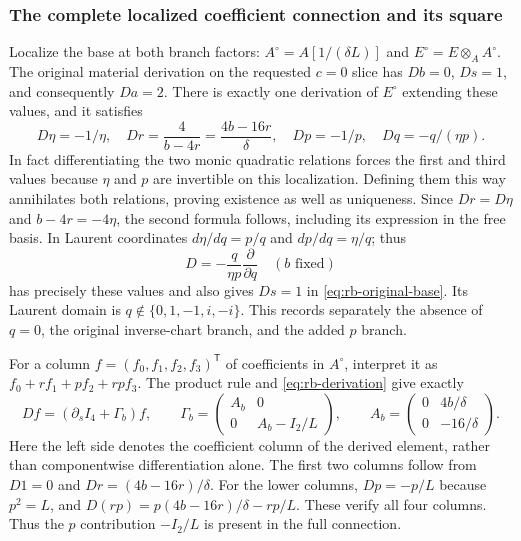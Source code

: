 \subsubsection{The complete localized coefficient connection and its square}
Localize the base at both branch factors: $A^\circ=A[1/(\delta L)]$
and $E^\circ=E\otimes_AA^\circ$. The original material derivation on
the requested $c=0$ slice has $Db=0$, $Ds=1$, and consequently
$Da=2$. There is exactly one derivation of $E^\circ$ extending
these values, and it satisfies
\begin{equation}\label{eq:rb-derivation}
 D\eta=-1/\eta,\quad
 Dr=\frac4{b-4r}=\frac{4b-16r}{\delta},\quad
 Dp=-1/p,\quad
 Dq=-q/(\eta p).
\end{equation}
In fact differentiating the two monic quadratic relations forces
the first and third values because $\eta$ and $p$ are invertible
on this localization. Defining them this way annihilates both
relations, proving existence as well as uniqueness. Since
$Dr=D\eta$ and $b-4r=-4\eta$, the second formula follows, including
its expression in the free basis. In Laurent coordinates
$d\eta/dq=p/q$ and $dp/dq=\eta/q$; thus
\[
 D=-\frac{q}{\eta p}\frac{\partial}{\partial q}\quad(b\text{ fixed})
\]
has precisely these values and also gives $Ds=1$ in
\eqref{eq:rb-original-base}. Its Laurent domain is
$q\notin\{0,1,-1,i,-i\}$. This records separately the absence of
$q=0$, the original inverse-chart branch, and the added $p$ branch.

For a column $f=(f_0,f_1,f_2,f_3)^{\mathsf T}$ of coefficients in
$A^\circ$, interpret it as $f_0+rf_1+pf_2+rpf_3$.
The product rule and \eqref{eq:rb-derivation} give exactly
\begin{equation}\label{eq:rb-full-connection}
 Df=(\partial_sI_4+\Gamma_b)f,\qquad
 \Gamma_b=\begin{pmatrix}A_b&0\\0&A_b-I_2/L\end{pmatrix},\qquad
 A_b=\begin{pmatrix}0&4b/\delta\\0&-16/\delta\end{pmatrix}.
\end{equation}
Here the left side denotes the coefficient column of the derived
element, rather than componentwise differentiation alone.
The first two columns follow from $D1=0$ and
$Dr=(4b-16r)/\delta$. For the lower columns, $Dp=-p/L$ because
$p^2=L$, and
$D(rp)=p(4b-16r)/\delta-rp/L$. These verify all four columns.
Thus the $p$ contribution $-I_2/L$ is present in the full connection.

